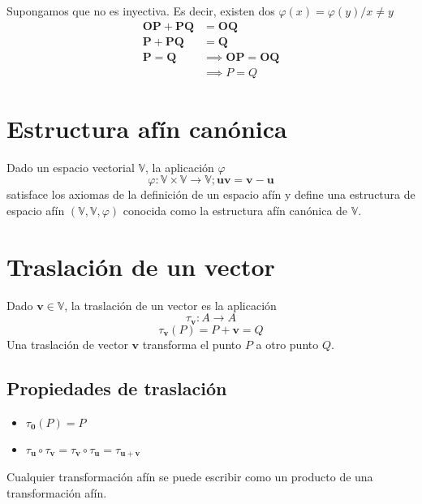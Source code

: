 \documentclass{./Geometria.tex}
\begin{document}
\begin{defin}
Supongamos que no es inyectiva. Es decir, existen dos $\varphi(x)=\varphi (y) / x \neq y$ 
\begin{equation}
	\begin{split}		
		\mathbf{OP}+\mathbf{PQ}&=\mathbf{OQ} \\
		\mathbf{P}+\mathbf{PQ}&=\mathbf{Q} \\
		\mathbf{P}=\mathbf{Q} &\implies \mathbf{OP}=\mathbf{OQ} \\
		&\implies P = Q
	\end{split}
\end{equation}
\end{defin}

\section{Estructura af\'in can\'onica}
Dado un espacio vectorial $\mathbb{V}$, la aplicaci\'on $\varphi$
$$
\varphi: \mathbb{V} \times \mathbb{V} \to \mathbb{V}; \mathbf{uv}=\mathbf{v}-\mathbf{u}
$$
satisface los axiomas de la definici\'on de un espacio af\'in y define una estructura de espacio af\'in $(\mathbb{V}, \mathbb{V}, \varphi)$ conocida como la estructura af\'in can\'onica de $\mathbb{V}$.

\section{Traslaci\'on de un vector}
Dado $\mathbf{v}\in \mathbb{V}$, la traslaci\'on de un vector es la aplicaci\'on
$$
\tau_{\mathbf{v}}: A \to A
$$
$$
\tau_{\mathbf{v}} (P)=P+\mathbf{v}=Q
$$
Una traslaci\'on de vector $\mathbf{v}$ transforma el punto $P$ a otro punto $Q$.

\subsection{Propiedades de traslaci\'on}
\begin{itemize}
    \item $\tau_{\mathbf{0}}(P)=P$
    \item $\tau_{\mathbf{u}} \circ \tau_{\mathbf{v}}=\tau_{\mathbf{v}} \circ\tau_{\mathbf{u}}=\tau_{\mathbf{u}+\mathbf{v}}$
\end{itemize}

\begin{teorema}
Cualquier transformaci\'on af\'in se puede escribir como un producto de una transformaci\'on af\'in.
\end{teorema}
\end{document}
